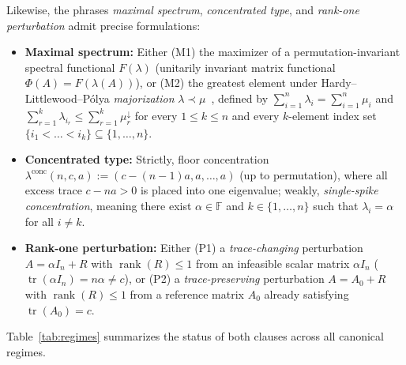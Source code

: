 \documentclass[11pt]{article}
\theoremstyle{definition}
\theoremstyle{remark}
\newcommand{\tr}{\operatorname{tr}}
\newcommand{\rk}{\operatorname{rank}}
\begin{document}
Likewise, the phrases \emph{maximal spectrum}, \emph{concentrated type}, and \emph{rank-one perturbation} admit precise formulations:
\begin{itemize}
  \item \textbf{Maximal spectrum:} Either (M1) the maximizer of a permutation-invariant spectral functional $F(\lambda)$ (unitarily invariant matrix functional $\Phi(A) = F(\lambda(A))$), or (M2) the greatest element under Hardy--Littlewood--P\'olya \emph{majorization} $\lambda \prec \mu$~\cite{HLP1952,MOA2011}, defined by $\sum_{i=1}^n \lambda_i = \sum_{i=1}^n \mu_i$ and $\sum_{r=1}^k \lambda_{i_r} \le \sum_{r=1}^k \mu_r^\downarrow$ for every $1 \le k \le n$ and every $k$-element index set $\{i_1 < \dots < i_k\} \subseteq \{1, \dots, n\}$.
  \item \textbf{Concentrated type:} Strictly, floor concentration $\lambda^{\mathrm{conc}}(n,c,a) := (c - (n-1)a, a, \dots, a)$ (up to permutation), where all excess trace $c - n a > 0$ is placed into one eigenvalue; weakly, \emph{single-spike concentration}, meaning there exist $\alpha \in \mathbb{F}$ and $k \in \{1, \dots, n\}$ such that $\lambda_i = \alpha$ for all $i \neq k$.
  \item \textbf{Rank-one perturbation:} Either (P1) a \emph{trace-changing} perturbation $A = \alpha I_n + R$ with $\rk(R) \le 1$ from an infeasible scalar matrix $\alpha I_n$ ($\tr(\alpha I_n) = n\alpha \neq c$), or (P2) a \emph{trace-preserving} perturbation $A = A_0 + R$ with $\rk(R) \le 1$ from a reference matrix $A_0$ already satisfying $\tr(A_0) = c$.
\end{itemize}

Table~\ref{tab:regimes} summarizes the status of both clauses across all canonical regimes.
\end{document}
